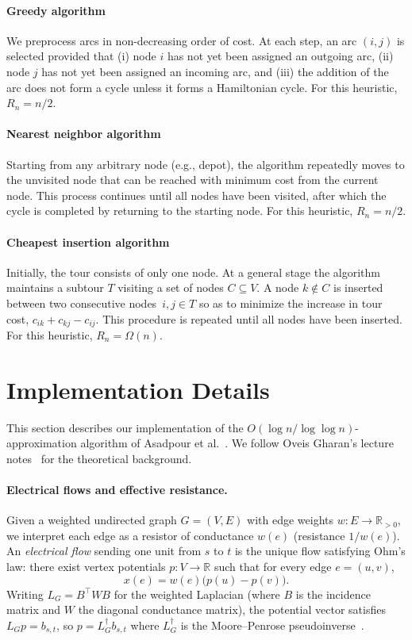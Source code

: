 \documentclass[12pt]{report}
\theoremstyle{definition}
\begin{document}
\paragraph{Greedy algorithm}
We preprocess arcs in non-decreasing order of cost. At each step, an arc $(i,j)$ is selected provided that (i) node $i$ has not yet been assigned an outgoing arc, (ii) node $j$ has not yet been assigned an incoming arc, and (iii) the addition of the arc does not form a cycle unless it forms a Hamiltonian cycle. For this heuristic, \(R_n = n/2\).

\paragraph{Nearest neighbor algorithm}
Starting from any arbitrary node (e.g., depot), the algorithm repeatedly moves to the unvisited node that can be reached with minimum cost from the current node. This process continues until all nodes have been visited, after which the cycle is completed by returning to the starting node. For this heuristic, \(R_n = n/2\).

\paragraph{Cheapest insertion algorithm}
Initially, the tour consists of only one node. At a general stage the algorithm maintains a subtour $T$ visiting a set of nodes $C \subseteq V$. A node $k \notin C$ is inserted between two consecutive nodes~$i,j \in T$ so as to minimize the increase in tour cost, \( c_{ik} + c_{kj} - c_{ij}\). This procedure is repeated until all nodes have been inserted. For this heuristic, \( R_n = \Omega(n)\).

\section{Implementation Details}
This section describes our implementation of the $O(\log n / \log \log n)$-approximation algorithm of Asadpour et al.~\cite{asadpour}. We follow Oveis Gharan's lecture notes~\cite{ovgharan2015lec4} for the theoretical background.

\paragraph{Electrical flows and effective resistance.}  
Given a weighted undirected graph $G = (V,E)$ with edge weights $w : E \to \mathbb{R}_{>0}$, we interpret each edge as a resistor of conductance $w(e)$ (resistance $1/w(e)$). An \emph{electrical flow} sending one unit from $s$ to $t$ is the unique flow satisfying Ohm's law: there exist vertex potentials $p : V \to \mathbb{R}$ such that for every edge $e = (u,v)$,
\[
x(e) = w(e) \bigl(p(u) - p(v)\bigr).
\]
Writing $L_G = B^\top W B$ for the weighted Laplacian (where $B$ is the incidence matrix and $W$ the diagonal conductance matrix), the potential vector satisfies $L_G p = b_{s,t}$, so $p = L_G^\dagger b_{s,t}$ where $L_G^\dagger$ is the Moore--Penrose pseudoinverse~\cite{ovgharan2015lec4}.
\end{document}
